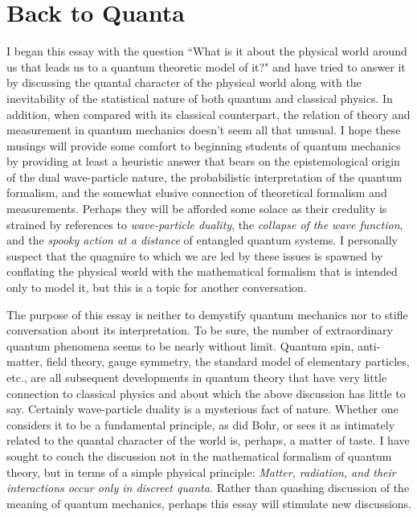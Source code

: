 \documentclass[12pt]{article}
\begin{document}
\section{Back to Quanta} \label{BTQ}

I began this essay with the question ``What is it about the physical world around us that leads us to a quantum theoretic model of it?" and have tried to answer it by discussing the quantal character of the physical world along with the inevitability of the statistical nature of both quantum and classical physics.  In addition, when compared with its classical counterpart, the relation of theory and measurement in quantum mechanics doesn't seem all that unusual.  I hope these musings will provide some comfort to beginning students of quantum mechanics by providing at least a heuristic answer that bears on the epistemological origin of the dual wave-particle nature, the probabilistic interpretation of the quantum formalism, and the somewhat elusive connection of theoretical formalism and measurements.  Perhaps they will be afforded some solace as their credulity is strained by references to {\it wave-particle duality}, the {\it collapse of the wave function}, and the {\it spooky action at a distance} of entangled quantum systems.  I personally suspect that the quagmire to which we are led by these issues is spawned by conflating the physical world with the mathematical formalism that is intended only to model it, but this is a topic for another conversation.

The purpose of this essay is neither to demystify quantum mechanics nor to stifle conversation about its interpretation.  To be sure, the number of extraordinary quantum phenomena seems to be nearly without limit.  Quantum spin, anti-matter, field theory, gauge symmetry, the standard model of elementary particles, etc., are all subsequent developments in quantum theory that have very little connection to classical physics and about which the above discussion has little to say.  Certainly wave-particle duality is a mysterious fact of nature.  Whether one considers it to be a fundamental principle, as did Bohr, or sees it as intimately related to the quantal character of the world is, perhaps, a matter of taste. I have sought to couch the discussion not in the mathematical formalism of quantum theory, but in terms of a simple physical principle: {\it Matter, radiation, and their interactions occur only in discreet quanta.}  Rather than quashing discussion of the meaning of quantum mechanics, perhaps this essay will stimulate new discussions.\vspace{7 mm}
\end{document}
